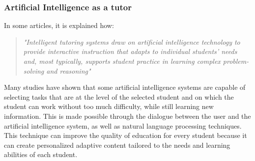 \documentclass[a4paper,12pt]{article}
\begin{document}
\subsubsection{Artificial Intelligence as a tutor}
In some articles\cite{aleven2009new}, it is explained how: \begin{quote}
\textit{
    "Intelligent tutoring systems draw on artificial intelligence technology to provide interactive instruction that adapts to individual students’ needs and, most typically, supports student practice in learning complex problem-solving and reasoning"}
\end{quote}
Many studies have shown that some artificial intelligence systems are capable of selecting tasks that are at the level of the selected student and on which the student can work without too much difficulty, while still learning new information. This is made possible through the dialogue between the user and the artificial intelligence system, as well as natural language processing techniques. This technique can improve the quality of education for every student because it can create personalized adaptive content tailored to the needs and learning abilities of each student.

\end{document}

